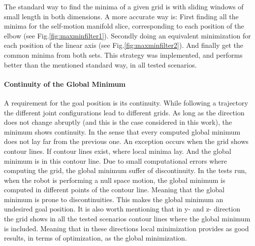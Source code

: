 
The standard way to find the minima of a given grid is with sliding windows of small length in both dimensions. A more accurate way is: First finding all the minima for the self-motion manifold slice, corresponding to each position of the elbow (see Fig.\ref{fig:maxminfilter1}). Secondly doing an equivalent minimization for each position of the linear axis (see Fig.\ref{fig:maxminfilter2}). 
And finally get the common minima from both sets. This strategy was implemented, and performs better than the mentioned standard way, in all tested scenarios. 

\paragraph{Continuity of the Global Minimum}

A requirement for the goal position is its continuity. While following a trajectory the different joint configurations lead to different grids. As long as the direction does not change abruptly (and this is the case considered in this work), the minimum shows continuity. In the sense that every computed global minimum does not lay far from the previous one. An exception occurs when the grid shows contour lines. If contour lines exist, where local minima lay. And the global minimum is in this contour line. Due to small computational errors where computing the grid, the global minimum suffer of discontinuity. In the tests run, when the robot is performing a null space motion, the global minimum is computed in different points of the contour line. Meaning that the global minimum is prone to discontinuities. This makes the global minimum an undesired goal position.
It is also worth mentioning that in y- and z- direction the grid shows in all the tested scenarios contour lines where the global minimum is included. Meaning that in these directions local minimization provides as good results, in terms of optimization, as the global minimization. 




















